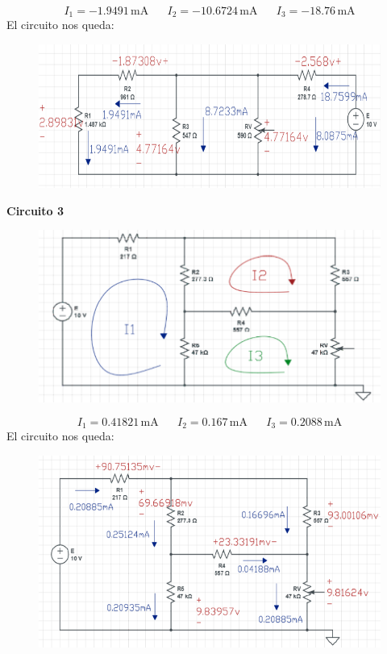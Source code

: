 \documentclass[a4paper,12pt]{report}
\begin{document}
\begin{enumerate}
$$
I_{1} = -1.9491\,\mathrm{mA} \hspace{20pt} I_{2} = -10.6724\,\mathrm{mA} \hspace{20pt} I_{3} = -18.76\,\mathrm{mA}
$$
El circuito nos queda:
\begin{figure}[H]
\begin{center}
\includegraphics[scale=0.55]{sergodcirc5,2.png}
\end{center}
\end{figure}
\newpage
\textbf{Circuito 3}
\begin{figure}[H]
\begin{center}
\includegraphics[scale=0.55]{sergodcirc3,3.png}
\end{center}
\end{figure}
$$
I_{1} = 0.41821\,\mathrm{mA} \hspace{20pt} I_{2} = 0.167\,\mathrm{mA} \hspace{20pt} I_{3} = 0.2088\,\mathrm{mA}
$$
El circuito nos queda:
\begin{figure}[H]
\begin{center}
\includegraphics[scale=0.55]{sergodcirc5,3.png}

\end{center}
\end{figure}
\end{enumerate}
\end{document}
